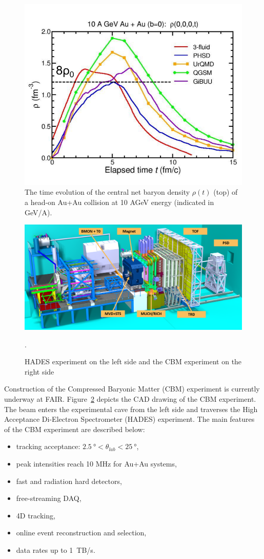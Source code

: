 \begin{figure}[!h]
    \centering
    \includegraphics[width=0.65\columnwidth]{Chapter1/images/CBM_density.png}
    \caption{The time evolution of the central net baryon density $\rho(t)$  (top) of a head-on Au+Au collision at 10 AGeV energy (indicated in GeV/A).}
    \label{fig:cbm_density}
\end{figure}



\begin{figure}[!h]
    \centering
    \includegraphics[width=0.95\columnwidth]{Chapter1/images/CBMnew.png}
    \caption{HADES experiment on the left side and the \gls{CBM} experiment on the right side}.
    \label{fig:exp}
\end{figure}

Construction of the Compressed Baryonic Matter (\gls{CBM}) experiment is currently underway at \gls{FAIR}. Figure~\ref{fig:exp} depicts the CAD drawing of the \gls{CBM} experiment. The beam enters the experimental cave from the left side and traverses the High Acceptance Di-Electron Spectrometer (\gls{HADES}) experiment.  The main features of the \gls{CBM} experiment are described below:
\begin{itemize}
\item tracking acceptance: $\SI{2.5}{\degree} < \theta_{lab} < \SI{25}{\degree}$,
\item peak intensities reach 10 MHz for Au+Au systems,
\item fast and radiation hard detectors,
\item free-streaming \gls{DAQ},
\item 4D tracking,
\item online event reconstruction and selection,
\item data rates up to 1~TB/s.
\end{itemize}




